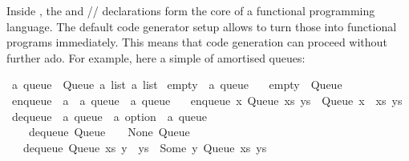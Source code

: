 \begin{isabellebody}
\begin{isamarkuptext}
  Inside \hyperlink{theory.HOL}{\mbox{}}, the \hyperlink{command.datatype}{\mbox{}} and
  \hyperlink{command.definition}{\mbox{}}/\hyperlink{command.primrec}{\mbox{}}/\hyperlink{command.fun}{\mbox{}} declarations form
  the core of a functional programming language.  The default code generator setup
  allows to turn those into functional programs immediately.
  This means that  code generation can proceed without further ado.
  For example, here a simple  of amortised queues:%
\end{isamarkuptext}%
\isamarkuptrue%
%
\isadelimquote
%
\endisadelimquote
%
\isatagquote
{}\isamarkupfalse%
\ {\isacharprime}a\ queue\ {\isacharequal}\ Queue\ {\isachardoublequoteopen}{\isacharprime}a\ list{\isachardoublequoteclose}\ {\isachardoublequoteopen}{\isacharprime}a\ list{\isachardoublequoteclose}\isanewline
\isanewline
{}\isamarkupfalse%
\ empty\ {\isacharcolon}{\isacharcolon}\ {\isachardoublequoteopen}{\isacharprime}a\ queue{\isachardoublequoteclose}\ \isanewline
\ \ {\isachardoublequoteopen}empty\ {\isacharequal}\ Queue\ {\isacharbrackleft}{\isacharbrackright}\ {\isacharbrackleft}{\isacharbrackright}{\isachardoublequoteclose}\isanewline
\isanewline
{}\isamarkupfalse%
\ enqueue\ {\isacharcolon}{\isacharcolon}\ {\isachardoublequoteopen}{\isacharprime}a\ {\isasymRightarrow}\ {\isacharprime}a\ queue\ {\isasymRightarrow}\ {\isacharprime}a\ queue{\isachardoublequoteclose}\ \isanewline
\ \ {\isachardoublequoteopen}enqueue\ x\ {\isacharparenleft}Queue\ xs\ ys{\isacharparenright}\ {\isacharequal}\ Queue\ {\isacharparenleft}x\ {\isacharhash}\ xs{\isacharparenright}\ ys{\isachardoublequoteclose}\isanewline
\isanewline
{}\isamarkupfalse%
\ dequeue\ {\isacharcolon}{\isacharcolon}\ {\isachardoublequoteopen}{\isacharprime}a\ queue\ {\isasymRightarrow}\ {\isacharprime}a\ option\ {\isasymtimes}\ {\isacharprime}a\ queue{\isachardoublequoteclose}\ \isanewline
\ \ \ \ {\isachardoublequoteopen}dequeue\ {\isacharparenleft}Queue\ {\isacharbrackleft}{\isacharbrackright}\ {\isacharbrackleft}{\isacharbrackright}{\isacharparenright}\ {\isacharequal}\ {\isacharparenleft}None{\isacharcomma}\ Queue\ {\isacharbrackleft}{\isacharbrackright}\ {\isacharbrackleft}{\isacharbrackright}{\isacharparenright}{\isachardoublequoteclose}\isanewline
\ \ {\isacharbar}\ {\isachardoublequoteopen}dequeue\ {\isacharparenleft}Queue\ xs\ {\isacharparenleft}y\ {\isacharhash}\ ys{\isacharparenright}{\isacharparenright}\ {\isacharequal}\ {\isacharparenleft}Some\ y{\isacharcomma}\ Queue\ xs\ ys{\isacharparenright}{\isachardoublequoteclose}\isanewline

\end{isabellebody}
